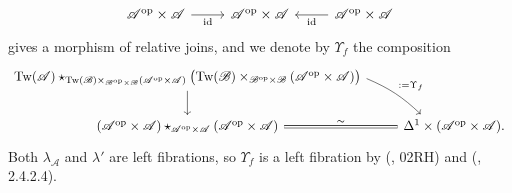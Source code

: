 \documentclass{tac}
\newcommand{\s}[1]{\mathscr{#1}}
\newcommand{\tx}[1]{\textnormal{#1}}
\begin{document}
\begin{construction}
\[\begin{tikzcd}
\s{A}^\tx{op}\times \s{A} \arrow[]{r}[swap]{\tx{id}} & \s{A}^\tx{op}\times \s{A} & \s{A}^\tx{op}\times \s{A} \arrow[]{l}{\tx{id}}
\end{tikzcd}\]
gives a morphism of relative joins, and we denote by $\Upsilon_f$ the composition
\[\begin{tikzcd} \tx{Tw}(\s{A}) \star_{\tx{Tw}(\s{B}) \times_{\s{B}^\tx{op} \times \s{B}} (\s{A}^\tx{op}\times \s{A})} \big(  \tx{Tw}(\s{B}) \times_{\s{B}^\tx{op} \times \s{B}} (\s{A}^\tx{op}\times \s{A}) \big) \arrow[]{d} \arrow[bend left=10]{dr}{:=\Upsilon_f} & \\ 
 (\s{A}^\tx{op}\times \s{A}) \star_{\s{A}^\tx{op}\times \s{A}} (\s{A}^\tx{op}\times \s{A}) \arrow[equal]{r}{\sim} & \Delta^1 \times (\s{A}^\tx{op}\times \s{A}) .\end{tikzcd}\]
Both $\lambda_\s{A}$ and $\lambda'$ are left fibrations, so $\Upsilon_f$ is a left fibration by (\cite{kerodon}, 02RH) and (\cite{htt}, 2.4.2.4). 
\end{construction}
\end{document}
